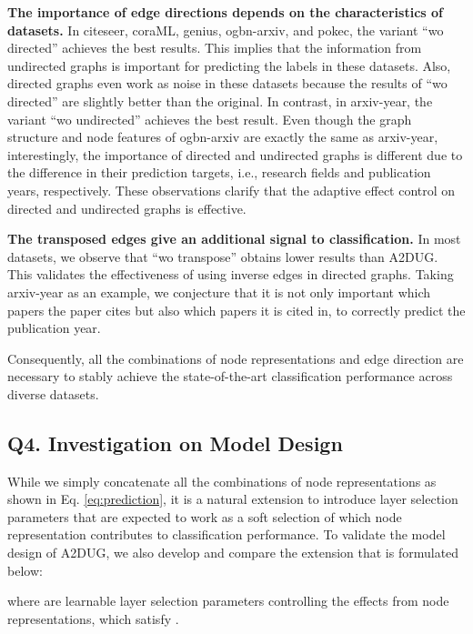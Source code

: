 \smallskip \noindent \textbf{The importance of edge directions depends on the characteristics of datasets. }
In citeseer, coraML, genius, ogbn-arxiv, and pokec, the variant ``wo directed'' achieves the best results.
This implies that the information from undirected graphs is important for predicting the labels in these datasets. 
Also, directed graphs even work as noise in these datasets because the results of ``wo directed'' are slightly better than the original.
In contrast, in arxiv-year, the variant ``wo undirected'' achieves the best result. 
Even though the graph structure and node features of ogbn-arxiv are exactly the same as arxiv-year, interestingly, the importance of directed and undirected graphs is different due to the difference in their prediction targets, i.e., research fields and publication years, respectively. 
These observations clarify that the adaptive effect control on directed and undirected graphs is effective. 


\smallskip \noindent \textbf{The transposed edges give an additional signal to classification. }
In most datasets, we observe that ``wo transpose'' obtains lower results than A2DUG.
This validates the effectiveness of using inverse edges in directed graphs.
Taking arxiv-year as an example, we conjecture that it is not only important which papers the paper cites but also which papers it is cited in, to correctly predict the publication year.

Consequently, all the combinations of node representations and edge direction are necessary to stably achieve the state-of-the-art classification performance across diverse datasets. 


\subsection{Q4. Investigation on Model Design}
\label{ssec:model_validity}
While we simply concatenate all the combinations of node representations as shown in Eq. \eqref{eq:prediction}, it is a natural extension to introduce layer selection parameters that are expected to work as a soft selection of which node representation contributes to classification performance.
To validate the model design of A2DUG, we also develop and compare the extension that is formulated below:

where  are learnable layer selection parameters controlling the effects from node representations, which satisfy . 

